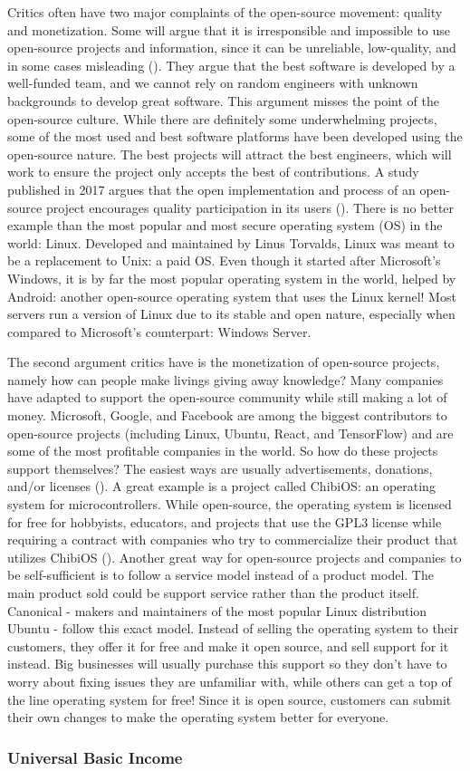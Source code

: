 Critics often have two major complaints of the open-source movement: quality and monetization. Some will argue that it is irresponsible and impossible to use open-source projects and information, since it can be unreliable, low-quality, and in some cases misleading (\cite{OpenSourceFail}). They argue that the best software is developed by a well-funded team, and we cannot rely on random engineers with unknown backgrounds to develop great software. This argument misses the point of the open-source culture. While there are definitely some underwhelming projects, some of the most used and best software platforms have been developed using the open-source nature. The best projects will attract the best engineers, which will work to ensure the project only accepts the best of contributions. A study published in 2017 argues that the open implementation and process of an open-source project encourages quality participation in its users (\cite{OpenSource_Good}). There is no better example than the most popular and most secure operating system (OS) in the world: Linux. Developed and maintained by Linus Torvalds, Linux was meant to be a replacement to Unix: a paid OS. Even though it started after Microsoft's Windows, it is by far the most popular operating system in the world, helped by Android: another open-source operating system that uses the Linux kernel! Most servers run a version of Linux due to its stable and open nature, especially when compared to Microsoft's counterpart: Windows Server.

The second argument critics have is the monetization of open-source projects, namely how can people make livings giving away knowledge? Many companies have adapted to support the open-source community while still making a lot of money. Microsoft, Google, and Facebook are among the biggest contributors to open-source projects (including Linux, Ubuntu, React, and TensorFlow) and are some of the most profitable companies in the world. So how do these projects support themselves? The easiest ways are usually advertisements, donations, and/or licenses (\cite{OpenSouceMakeMoney}). A great example is a project called ChibiOS: an operating system for microcontrollers. While open-source, the operating system is licensed for free for hobbyists, educators, and projects that use the GPL3 license while requiring a contract with companies who try to commercialize their product that utilizes ChibiOS (\cite{ChibiOS}). Another great way for open-source projects and companies to be self-sufficient is to follow a service model instead of a product model. The main product sold could be support service rather than the product itself. Canonical - makers and maintainers of the most popular Linux distribution Ubuntu - follow this exact model. Instead of selling the operating system to their customers, they offer it for free and make it open source, and sell support for it instead. Big businesses will usually purchase this support so they don't have to worry about fixing issues they are unfamiliar with, while others can get a top of the line operating system for free! Since it is open source, customers can submit their own changes to make the operating system better for everyone. 

\subsubsection{Universal Basic Income}

